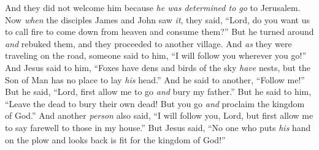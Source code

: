 \begin{biblechapter}
\verse And they did not welcome him because \textit{he was determined to go} to Jerusalem.
\verse Now \textit{when} the disciples James and John saw \textit{it}, they said, “Lord, do you want us to call fire to come down from heaven and consume them?”
\verse But he turned around \textit{and} rebuked them,
\verse and they proceeded to another village.
 And \textit{as} they were traveling on the road, someone said to him, “I will follow you wherever you go!”
\verse And Jesus said to him, “Foxes have dens and birds of the sky \textit{have} nests, but the Son of Man has no place to lay \textit{his} head.”
\verse And he said to another, “Follow me!” But he said, “Lord, first allow me to go \textit{and} bury my father.”
\verse But he said to him, “Leave the dead to bury their own dead! But you go \textit{and} proclaim the kingdom of God.”
\verse And another \textit{person} also said, “I will follow you, Lord, but first allow me to say farewell to those in my house.”
\verse But Jesus said, “No one who puts \textit{his} hand on the plow and looks back is fit for the kingdom of God!”
\end{biblechapter}

